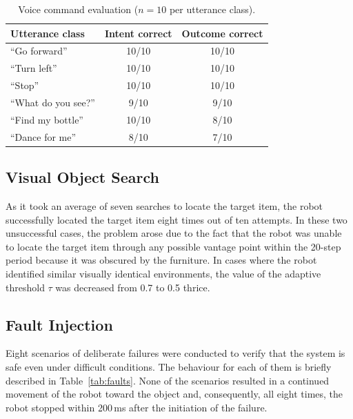 \documentclass[conference]{IEEEtran}
\begin{document}
\begin{table}[t]
\caption{Voice command evaluation ($n{=}10$ per utterance class).}
\label{tab:voice}
\centering
\renewcommand{\arraystretch}{1.05}
\begin{tabularx}{\columnwidth}{@{}YCC@{}}
\toprule
\textbf{Utterance class} & \textbf{Intent correct} & \textbf{Outcome correct} \\
\midrule
``Go forward'' & 10/10 & 10/10 \\
``Turn left'' & 10/10 & 10/10 \\
``Stop'' & 10/10 & 10/10 \\
``What do you see?'' & 9/10 & 9/10 \\
``Find my bottle'' & 10/10 & 8/10 \\
``Dance for me'' & 8/10 & 7/10 \\
\bottomrule
\end{tabularx}
\end{table}

\subsection{Visual Object Search}

As it took an average of seven searches to locate the target item, the robot successfully located the target item eight times out of ten attempts. In these two unsuccessful cases, the problem arose due to the fact that the robot was unable to locate the target item through any possible vantage point within the 20-step period because it was obscured by the furniture. In cases where the robot identified similar visually identical environments, the value of the adaptive threshold $\tau$ was decreased from 0.7 to 0.5 thrice.

\subsection{Fault Injection}

Eight scenarios of deliberate failures were conducted to verify that the system is safe even under difficult conditions. The behaviour for each of them is briefly described in Table~\ref{tab:faults}. None of the scenarios resulted in a continued movement of the robot toward the object and, consequently, all eight times, the robot stopped within 200\,ms after the initiation of the failure.
\end{document}
